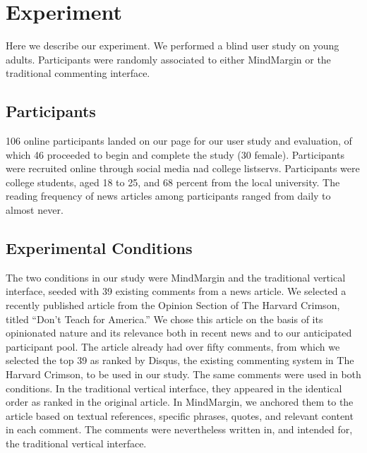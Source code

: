 \section{Experiment}

Here we describe our experiment. We performed a blind user study on young adults. Participants were randomly associated to either MindMargin or the traditional commenting interface.

\subsection{Participants}
106 online participants landed on our page for our user study and evaluation, of which 46 proceeded to begin and complete the study (30 female). Participants were recruited online through social media nad college listservs. Participants were college students, aged 18 to 25, and 68 percent from the local university. The reading frequency of news articles among participants ranged from daily to almost never. 

\subsection{Experimental Conditions}
The two conditions in our study were MindMargin and the traditional vertical interface, seeded with 39 existing comments from a news article. We selected a recently published article from the Opinion Section of The Harvard Crimson, titled “Don’t Teach for America.” We chose this article on the basis of its opinionated nature and its relevance both in recent news and to our anticipated participant pool. The article already had over fifty comments, from which we selected the top 39 as ranked by Disqus, the existing commenting system in The Harvard Crimson, to be used in our study. The same comments were used in both conditions. In the traditional vertical interface, they appeared in the identical order as ranked in the original article. In MindMargin, we anchored them to the article based on textual references, specific phrases, quotes, and relevant content in each comment. The comments were nevertheless written in, and intended for, the traditional vertical interface.

